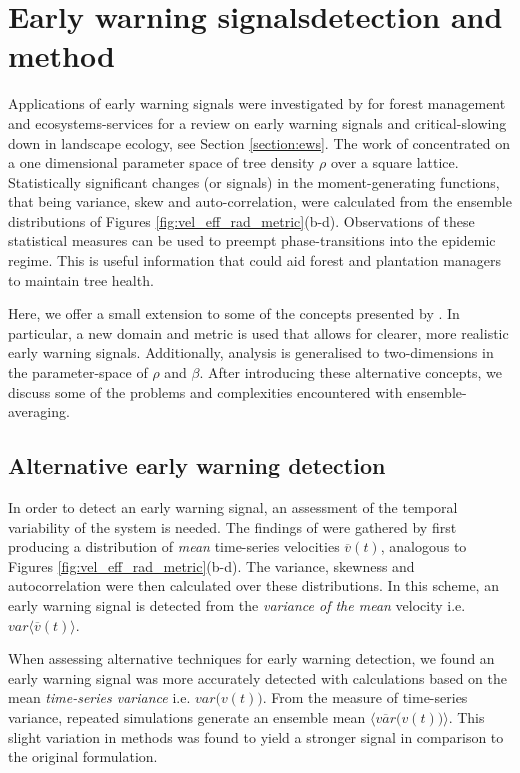 \section{Early warning signals\textemdash detection and method}

Applications of early warning signals were investigated by \cite{OROZCOFUENTES201912} for forest management and ecosystems-services
\textemdash for a review on early 
warning signals and critical-slowing down in landscape ecology, see Section \ref{section:ews}. 
The work of \cite{OROZCOFUENTES201912} concentrated on a one dimensional parameter space of %
tree density $\rho$ over a square lattice. %
Statistically significant changes (or signals) in the moment-generating functions, %
that being variance, skew and auto-correlation, were calculated from the ensemble distributions of Figures \ref{fig:vel_eff_rad_metric}(b-d). %
Observations of these statistical measures can be used to preempt phase-transitions into the epidemic regime. %
This is useful information that could aid forest and plantation managers to maintain tree health. %

Here, we offer a small extension to some of the concepts presented by \cite{OROZCOFUENTES201912}. %
In particular, a new domain and metric is used that allows for clearer, more realistic early warning signals.  %
Additionally, analysis is generalised to two-dimensions in the parameter-space of $\rho$ and $\beta$. %
After introducing these alternative concepts, we discuss some of the problems and complexities encountered with ensemble-averaging. %

\subsection{Alternative early warning detection}

In order to detect an early warning signal, an assessment of  the temporal variability of the system is needed. %
The findings of \cite{OROZCOFUENTES201912} were gathered by first producing a distribution of \textit{mean} time-series velocities $\overline{v}(t)$, %
analogous to Figures \ref{fig:vel_eff_rad_metric}(b-d). %
The variance, skewness and autocorrelation were then calculated over these distributions. %
In this scheme, an early warning signal is detected from the \textit{variance of the mean} velocity i.e. $var\big\langle \overline{v}(t) \big\rangle $. %

When assessing alternative techniques for early warning detection, we found an early warning signal was more accurately %
detected with calculations based on the mean \textit{time-series variance} i.e. $var\big(v(t) \big)$. %
From the measure of time-series variance, repeated simulations generate an ensemble mean $\langle \overline{var}\big(v(t) \big)\rangle$. %
This slight variation in methods was found to yield a stronger signal in comparison to the original formulation. %

